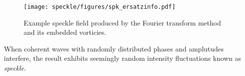 \begin{figure}[ht]
\centering
\texttt{[image: speckle/figures/spk\_ersatzinfo.pdf]}
\caption{Example speckle field produced by the Fourier transform method and
its embedded vorticies.}
\end{figure}

When coherent waves with randomly distributed phases and amplutudes
interfere, the result exhibits seemingly random intensity fluctuations
known as \textit{speckle}.  

